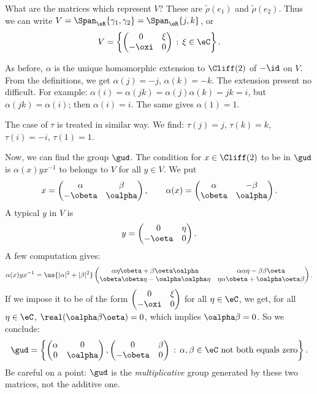 What are the matrices which represent $V$? These are $\tilde\rho(e_1)$ and $\tilde\rho(e_2)$. Thus we can write $V=\Span_{\eR}\{\gamma_1,\gamma_2\}=\Span_{\eR}\{j,k\}$, or
\[
 V=\left\{\begin{pmatrix}
 0 & \xi \\
 -\oxi & 0
 \end{pmatrix}\,:\,\xi\in\eC\right\}.
\]

As before, $\alpha$ is the unique homomorphic extension to $\Cliff(2)$ of $-\id$ on $V$. From the definitions, we get $\alpha(j)=-j$, $\alpha(k)=-k$.
The extension present no difficult. For example: $\alpha(i)=\alpha(jk)=\alpha(j)\alpha(k)=jk=i$, but $\alpha(jk)=\alpha(i)$; then $\alpha(i)=i$. The same gives $\alpha(1)=1$.

The case of $\tau$ is treated in similar way. We find: $\tau(j)=j$, $\tau(k)=k$, $\tau(i)=-i$, $\tau(1)=1$.

Now, we can find the group $\gud$. The condition for $x\in\Cliff(2)$ to be in $\gud$ is $\alpha(x)yx^{-1}$ to belongs to $V$ for all $y\in V$. We put
\[ x=\begin{pmatrix}
\alpha & \beta \\
-\obeta & \oalpha
\end{pmatrix},\qquad\alpha(x)=\begin{pmatrix}
\alpha & -\beta \\
\obeta & \oalpha
\end{pmatrix}.\]
A typical $y$ in $V$ is
\[
 y=\begin{pmatrix}
 0 & \eta \\
 -\oeta & 0
 \end{pmatrix}.
\]
A few computation gives:
\[
 \alpha(x)yx^{-1}=\us{|\alpha|^2+|\beta|^2}\begin{pmatrix}
 \alpha\eta\obeta+\beta\oeta\oalpha & \alpha\alpha\eta-\beta\beta\oeta \\
 \obeta\obeta\eta-\oalpha\oalpha\eta & \eta\alpha\obeta+\oalpha\oeta\beta
 \end{pmatrix}.
\]
If we impose it to be of the form $\begin{pmatrix}
0 & \xi \\
-\oxi & 0
\end{pmatrix} $ for all $\eta\in\eC$, we get, for all $\eta\in\eC$,
 $\real(\oalpha\beta\oeta)=0$, which implies $\oalpha\beta=0$. So we conclude:
\[
 \gud=\left\{\begin{pmatrix}
 \alpha & 0 \\
 0 & \oalpha
 \end{pmatrix}, \begin{pmatrix}
 0 & \beta \\
 -\obeta & 0
 \end{pmatrix}\,:\,\alpha,\beta\in\eC\textrm{ not both equals zero}\right\}.
\]
Be careful on a point: $\gud$ is the \emph{multiplicative} group generated by these two matrices, not the additive one.

